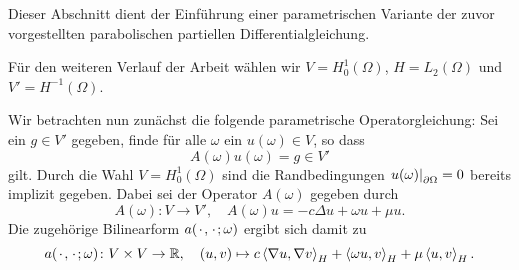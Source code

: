 Dieser Abschnitt dient der Einführung einer parametrischen Variante der zuvor vorgestellten parabolischen partiellen Differentialgleichung.

Für den weiteren Verlauf der Arbeit wählen wir $V = H^{1}_{0}(\Omega)$, $H = L_{2}(\Omega)$ und $V' = H^{-1}(\Omega)$.

Wir betrachten nun zunächst die folgende parametrische Operatorgleichung: Sei ein $g \in V'$ gegeben, finde für alle $\omega$ ein $u(\omega) \in V$, so dass
\begin{equation}
    A(\omega) u(\omega) = g \in V'
\end{equation}
gilt.
Durch die Wahl $V = H^{1}_{0}(\Omega)$ sind die Randbedingungen $\left.u(\omega)\right|_{\partial \Omega} = 0$ bereits implizit gegeben.
Dabei sei der Operator $A(\omega)$ gegeben durch
\begin{equation}
    \label{eq:pp:op_a}
    A(\omega) \colon V \to V', \quad A(\omega) u = - c \Delta u + \omega u + \mu u.
\end{equation}
Die zugehörige Bilinearform $a({\mkern2mu\cdot\mkern2mu}, {\mkern2mu\cdot\mkern2mu}; \omega)$ ergibt sich damit zu
\begin{equation}
    \label{eq:pp:bf_a}
    a({\mkern2mu\cdot\mkern2mu}, {\mkern2mu\cdot\mkern2mu}; \omega) \colon V \times V \to \mathbb{R},
    \quad (u, v) \mapsto c\left\langle\nabla u,\nabla v\right\rangle_{H} + \left\langle\omega u,v\right\rangle_{H} + \mu \left\langle u,v\right\rangle_{H}.
\end{equation}

